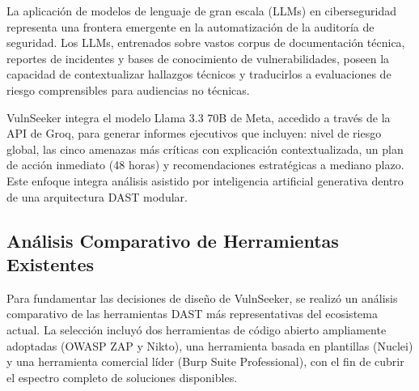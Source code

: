 \documentclass[12pt, a4paper]{article}
\begin{document}
La aplicación de modelos de lenguaje de gran escala (LLMs) en ciberseguridad
representa una frontera emergente en la automatización de la auditoría de
seguridad. Los LLMs, entrenados sobre vastos corpus de documentación técnica,
reportes de incidentes y bases de conocimiento de vulnerabilidades, poseen la
capacidad de contextualizar hallazgos técnicos y traducirlos a evaluaciones de
riesgo comprensibles para audiencias no técnicas.

VulnSeeker integra el modelo Llama 3.3 70B de Meta, accedido a través de la API
de Groq, para generar informes ejecutivos que incluyen: nivel de riesgo global,
las cinco amenazas más críticas con explicación contextualizada, un plan de
acción inmediato (48 horas) y recomendaciones estratégicas a mediano plazo. Este
enfoque integra análisis asistido por inteligencia artificial generativa dentro
de una arquitectura DAST modular.


\subsection{Análisis Comparativo de Herramientas Existentes}

Para fundamentar las decisiones de diseño de VulnSeeker, se realizó un análisis
comparativo de las herramientas DAST más representativas del ecosistema actual.
La selección incluyó dos herramientas de código abierto ampliamente adoptadas
(OWASP ZAP y Nikto), una herramienta basada en plantillas (Nuclei) y una
herramienta comercial líder (Burp Suite Professional), con el fin de cubrir el
espectro completo de soluciones disponibles.
\end{document}
